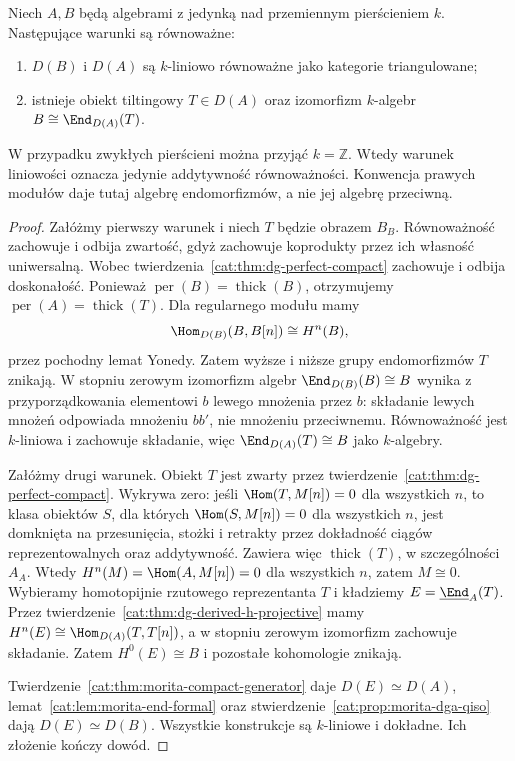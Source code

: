 \begin{twierdzenie}\label{cat:thm:morita-rickard}
Niech $A,B$ będą algebrami z jedynką nad przemiennym pierścieniem $k$. Następujące warunki są równoważne:
\begin{enumerate}
 \item $D(B)$ i $D(A)$ są $k$-liniowo równoważne jako kategorie triangulowane;
 \item istnieje obiekt tiltingowy $T\in D(A)$ oraz izomorfizm $k$-algebr $B\cong\End_{D(A)}(T)$.
\end{enumerate}
W przypadku zwykłych pierścieni można przyjąć $k=\mathbb Z$. Wtedy warunek liniowości oznacza jedynie addytywność równoważności. Konwencja prawych modułów daje tutaj algebrę endomorfizmów, a nie jej algebrę przeciwną.
\end{twierdzenie}
\begin{proof}
Załóżmy pierwszy warunek i niech $T$ będzie obrazem $B_B$. Równoważność zachowuje i odbija zwartość, gdyż zachowuje koprodukty przez ich własność uniwersalną. Wobec twierdzenia~\ref{cat:thm:dg-perfect-compact} zachowuje i odbija doskonałość. Ponieważ $\operatorname{per}(B)=\operatorname{thick}(B)$, otrzymujemy $\operatorname{per}(A)=\operatorname{thick}(T)$. Dla regularnego modułu mamy
\[
 \Hom_{D(B)}(B,B[n])\cong H^n(B),
\]
przez pochodny lemat Yonedy. Zatem wyższe i niższe grupy endomorfizmów $T$ znikają. W stopniu zerowym izomorfizm algebr $\End_{D(B)}(B)\cong B$ wynika z przyporządkowania elementowi $b$ lewego mnożenia przez $b$: składanie lewych mnożeń odpowiada mnożeniu $bb'$, nie mnożeniu przeciwnemu. Równoważność jest $k$-liniowa i zachowuje składanie, więc $\End_{D(A)}(T)\cong B$ jako $k$-algebry.

Załóżmy drugi warunek. Obiekt $T$ jest zwarty przez twierdzenie~\ref{cat:thm:dg-perfect-compact}. Wykrywa zero: jeśli $\Hom(T,M[n])=0$ dla wszystkich $n$, to klasa obiektów $S$, dla których $\Hom(S,M[n])=0$ dla wszystkich $n$, jest domknięta na przesunięcia, stożki i retrakty przez dokładność ciągów reprezentowalnych oraz addytywność. Zawiera więc $\operatorname{thick}(T)$, w szczególności $A_A$. Wtedy $H^n(M)=\Hom(A,M[n])=0$ dla wszystkich $n$, zatem $M\cong0$. Wybieramy homotopijnie rzutowego reprezentanta $T$ i kładziemy $E=\underline{\End}_A(T)$. Przez twierdzenie~\ref{cat:thm:dg-derived-h-projective} mamy $H^n(E)\cong\Hom_{D(A)}(T,T[n])$, a w stopniu zerowym izomorfizm zachowuje składanie. Zatem $H^0(E)\cong B$ i pozostałe kohomologie znikają.

Twierdzenie~\ref{cat:thm:morita-compact-generator} daje $D(E)\simeq D(A)$, lemat~\ref{cat:lem:morita-end-formal} oraz stwierdzenie~\ref{cat:prop:morita-dga-qiso} dają $D(E)\simeq D(B)$. Wszystkie konstrukcje są $k$-liniowe i dokładne. Ich złożenie kończy dowód.
\end{proof}


